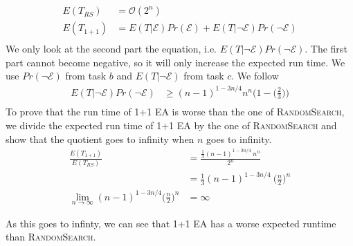 \documentclass[12pt,a4paper]{article}
\begin{document}
\section{}
\begin{align*}
E(T_{RS})&=\mathcal{O}(2^n)\\
E(T_{1+1})&=E(T|\mathcal{E})Pr(\mathcal{E}) + E(T|\neg \mathcal{E})Pr(\neg \mathcal{E})\\
\end{align*}
We only  look at the second part the equation, i.e. $E(T|\neg \mathcal{E})Pr(\neg \mathcal{E})$. The first part cannot become negative, so it will only increase the expected run time. We use $Pr(\neg \mathcal{E})$ from task $b$ and $E(T|\neg \mathcal{E})$ from task $c$. We follow
\begin{align*}
 E(T|\neg \mathcal{E})Pr(\neg \mathcal{E})& \geq
 (n-1)^{1-3n/4} n^{n} \Bigg(1-\Big(\frac{2}{3}\Big)\Bigg)\\
\end{align*}
To prove that the run time of \textsc{1+1 EA} is worse than the one of \textsc{RandomSearch}, we divide the expected run time of 1+1 EA by the one of \textsc{RandomSearch} and show that the quotient goes to infinity when $n$ goes to infinity. \begin{align*}
 \frac{E(T_{1+1})}{E(T_{RS})} &= \frac{\frac{1}{3}(n-1)^{1-3n/4}\ n^{n}}{2^n} \\
 &= \frac{1}{3}(n-1)^{1-3n/4}\ \Big(\frac{n}{2}\Big)^n \\
 \lim_{n\to\infty} (n-1)^{1-3n/4}\Big(\frac{n}{2}\Big)^n &= \infty
\end{align*}

As this goes to infinty, we can see that 1+1 EA has a worse expected runtime than \textsc{RandomSearch}.
\end{document}
